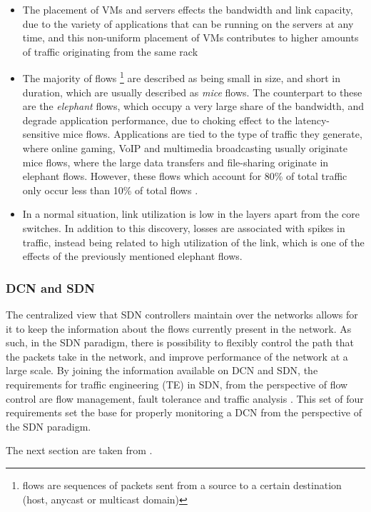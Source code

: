 \begin {itemize}
    \item The placement of VMs and servers effects the bandwidth and link capacity, due to the variety of applications that can be running on the servers at any time, and this non-uniform placement of VMs contributes to higher
        amounts of traffic originating from the same rack
    \item The majority of flows \footnote {flows are sequences of packets sent from a source to a certain destination (host, anycast or multicast domain)} are described as being small in size, and short in duration,
        which are usually described as \textit {mice} flows. 
        The counterpart to these are the \textit {elephant} flows, which occupy a very large share of the bandwidth, and degrade application performance, due to choking effect to the latency-sensitive mice flows. 
        Applications are tied to the type of traffic they generate, where online gaming, VoIP and multimedia broadcasting usually originate mice flows, where the large data transfers and file-sharing originate in elephant flows. 
        However, these flows which account for 80\% of total traffic only occur less than 10\% of total flows \cite {CITE - Broadcom Engineered Elephant flow for boosting ... }.
    \item In a normal situation, link utilization is low in the layers apart from the core switches. In addition to this discovery, losses are associated with spikes in traffic, instead being related to high utilization 
        of the link, which is one of the effects of the previously mentioned elephant flows.
\end {itemize}

\subsubsection {DCN and SDN}

\par The centralized view that SDN controllers maintain over the networks allows for it to keep the information about the flows currently present in the network. As such, in the SDN paradigm, there is possibility to flexibly control 
the path that the packets take in the network, and improve performance of the network at a large scale. By joining the information available on DCN and SDN, the requirements for traffic engineering (TE) in SDN, from
the perspective of flow control are flow management, fault tolerance and traffic analysis \cite { CITE - traffic_engineering_sdn}. This set of four requirements set the base for properly monitoring a DCN from the 
perspective of the SDN paradigm.
\par The next section are taken from \cite { CITE - traffic_engineering_sdn}.

